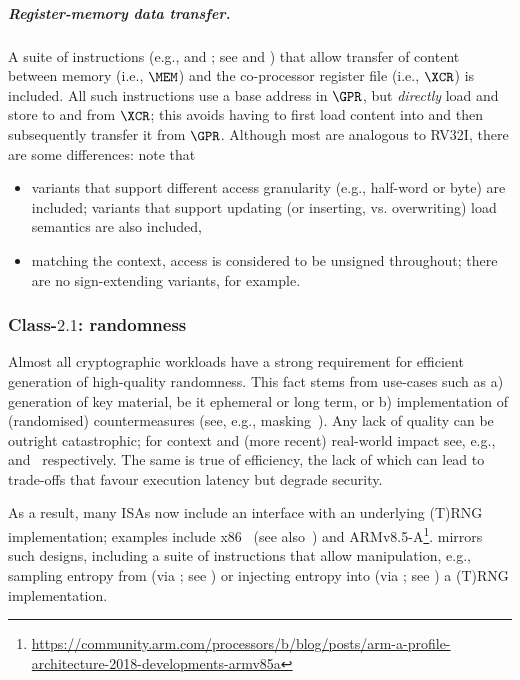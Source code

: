 \subparagraph{Register-memory   data transfer.}

A suite of instructions 
(e.g.,  and ; see  and )
that allow 
transfer of content between
   memory                         (i.e., $\MEM$)
and
the    co-processor register file (i.e., $\XCR$)
is included.
All such instructions use a base address in $\GPR$, but {\em directly} load 
and store to and from $\XCR$; this avoids having to first load content into 
and then subsequently transfer it from $\GPR$.
Although most are analogous to RV32I, there are some differences: note that

\begin{itemize}
\item variants that support different access granularity (e.g., half-word or
      byte) are included; variants that support updating (or inserting, vs. 
      overwriting) load semantics are also included,
\item matching the context, access is considered to be unsigned throughout;
      there are no sign-extending variants, for example.
\end{itemize}


\subsubsection{Class-$2.1$: randomness}
\label{sec:bg:feature:2:1}

Almost all cryptographic workloads have a strong requirement for efficient
generation of high-quality randomness.  This fact stems from use-cases such
as
a) generation of key material, be it ephemeral or long term,
   or
b) implementation of (randomised) countermeasures
   (see, e.g., masking~\cite[Chapter 9]{SCARV:ManOswPop:07}).
Any lack of quality can be outright catastrophic;
for context and (more recent) real-world impact see, e.g.,~\cite{SCARV:KSWH:98,SCARV:RFC:4086} and~\cite{SCARV:NSSKM:17} respectively.
The same is true of efficiency, the lack of which can lead to trade-offs 
that favour execution latency but degrade security.

As a result, many ISAs now include an interface with an underlying (T)RNG
implementation; examples include
x86~\cite[Section 7.3.17.1 and 7.3.17.2]{SCARV:X86:2:18} (see also~\cite{SCARV:JunKoc:99,SCARV:HamKocMar:12})
and
ARMv8.5-A\footnote{
\url{https://community.arm.com/processors/b/blog/posts/arm-a-profile-architecture-2018-developments-armv85a}
}.  \XCID mirrors such designs, including
a suite of instructions 
that allow 
manipulation, e.g.,
 sampling entropy from (via ; see )
or
injecting entropy into (via ; see )
a (T)RNG implementation.

